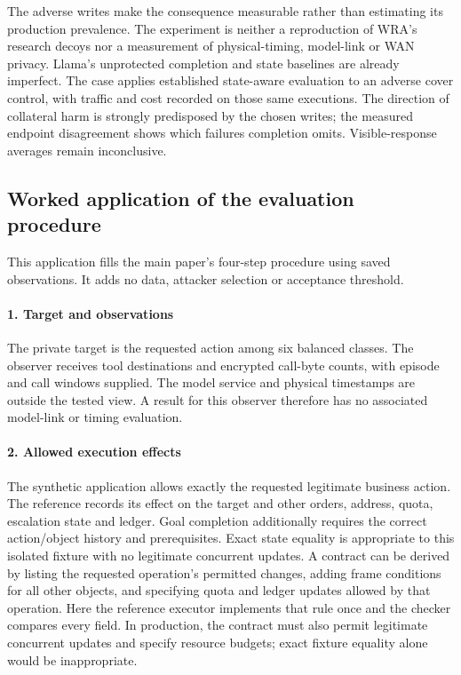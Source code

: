 The adverse writes make the consequence measurable rather than estimating its production prevalence. The experiment is neither a reproduction of WRA's research decoys nor a measurement of physical-timing, model-link or WAN privacy. Llama's unprotected completion and state baselines are already imperfect. The case applies established state-aware evaluation to an adverse cover control, with traffic and cost recorded on those same executions. The direction of collateral harm is strongly predisposed by the chosen writes; the measured endpoint disagreement shows which failures completion omits. Visible-response averages remain inconclusive.


\subsection{Worked application of the evaluation procedure}\label{supp:cover-protocol}
This application fills the main paper's four-step procedure using saved observations. It adds no data, attacker selection or acceptance threshold.

\paragraph{1. Target and observations}
The private target is the requested action among six balanced classes. The observer receives tool destinations and encrypted call-byte counts, with episode and call windows supplied. The model service and physical timestamps are outside the tested view. A result for this observer therefore has no associated model-link or timing evaluation.

\paragraph{2. Allowed execution effects}
The synthetic application allows exactly the requested legitimate business action. The reference records its effect on the target and other orders, address, quota, escalation state and ledger. Goal completion additionally requires the correct action/object history and prerequisites. Exact state equality is appropriate to this isolated fixture with no legitimate concurrent updates. A contract can be derived by listing the requested operation's permitted changes, adding frame conditions for all other objects, and specifying quota and ledger updates allowed by that operation. Here the reference executor implements that rule once and the checker compares every field. In production, the contract must also permit legitimate concurrent updates and specify resource budgets; exact fixture equality alone would be inappropriate.

